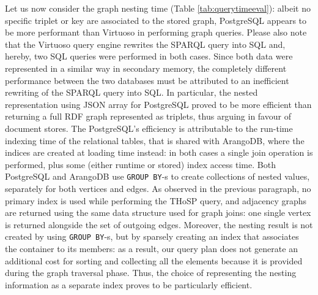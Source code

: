 Let us now consider the graph nesting time (Table \ref{tab:querytimeeval}): albeit no specific triplet or key are associated to the stored graph, PostgreSQL appears to be more performant than Virtuoso in performing graph queries. Please also note that the Virtuoso query engine rewrites the SPARQL query into SQL and, hereby, two SQL queries were performed in both cases. Since both data were represented in a similar way in secondary memory, the completely different performance between the two databases must be attributed  to an inefficient rewriting of the SPARQL query into SQL. In particular, the nested representation using JSON array for PostgreSQL proved to be more efficient than returning a full RDF graph represented as triplets, thus arguing in favour of document stores. The PostgreSQL's efficiency is attributable to the run-time indexing time of the relational tables, that is shared with ArangoDB, where the indices are created at loading time instead: in both cases a single join operation is performed, plus some (either runtime or stored) index access time. Both PostgreSQL and ArangoDB use \texttt{GROUP BY}-s to create collections of nested values, separately for both vertices and edges. As observed in the previous paragraph, no primary index is used while performing the THoSP query, and adjacency graphs are returned using the same data structure used for graph joins: one single vertex is returned alongside the set of outgoing edges. Moreover, the nesting result is not created by using \texttt{GROUP BY}-s, but by sparsely creating an index that associates the container to its members: as a result, our query plan does not generate an additional cost for sorting and collecting all the elements because it is provided during the graph traversal phase. Thus, the choice of representing the nesting information as a separate index proves to be particularly efficient.
